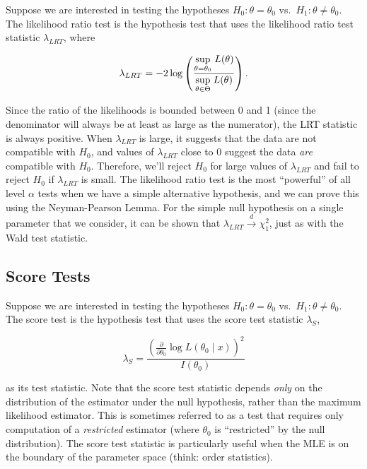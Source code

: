 \documentclass[
  letterpaper,
  DIV=11,
  numbers=noendperiod]{scrreprt}
\begin{document}
Suppose we are interested in testing the hypotheses
\(H_0: \theta = \theta_0\) vs.~\(H_1: \theta \neq \theta_0\). The
likelihood ratio test is the hypothesis test that uses the likelihood
ratio test statistic \(\lambda_{LRT}\), where

\[
\lambda_{LRT} = -2 \log\left(\frac{\underset{\theta = \theta_0}{\text{sup}} \hspace{1mm} L(\theta)}{\underset{\theta \in \Theta}{\text{sup}} \hspace{1mm} L(\theta)} \right).
\]

Since the ratio of the likelihoods is bounded between 0 and 1 (since the
denominator will always be at least as large as the numerator), the LRT
statistic is always positive. When \(\lambda_{LRT}\) is large, it
suggests that the data are not compatible with \(H_0\), and values of
\(\lambda_{LRT}\) close to \(0\) suggest the data \emph{are} compatible
with \(H_0\). Therefore, we'll reject \(H_0\) for large values of
\(\lambda_{LRT}\) and fail to reject \(H_0\) if \(\lambda_{LRT}\) is
small. The likelihood ratio test is the most ``powerful'' of all level
\(\alpha\) tests when we have a simple alternative hypothesis, and we
can prove this using the Neyman-Pearson Lemma. For the simple null
hypothesis on a single parameter that we consider, it can be shown that
\(\lambda_{LRT} \overset{d}{\to} \chi^2_1\), just as with the Wald test
statistic.

\subsection*{Score Tests}\label{score-tests}

Suppose we are interested in testing the hypotheses
\(H_0: \theta = \theta_0\) vs.~\(H_1: \theta \neq \theta_0\). The score
test is the hypothesis test that uses the score test statistic
\(\lambda_S\),

\[
\lambda_S = \frac{\left( \frac{\partial}{\partial \theta_0} \log L(\theta_0 \mid x) \right)^2}{I(\theta_0)}
\]

as its test statistic. Note that the score test statistic depends
\emph{only} on the distribution of the estimator under the null
hypothesis, rather than the maximum likelihood estimator. This is
sometimes referred to as a test that requires only computation of a
\emph{restricted} estimator (where \(\theta_0\) is ``restricted'' by the
null distribution). The score test statistic is particularly useful when
the MLE is on the boundary of the parameter space (think: order
statistics).
\end{document}
